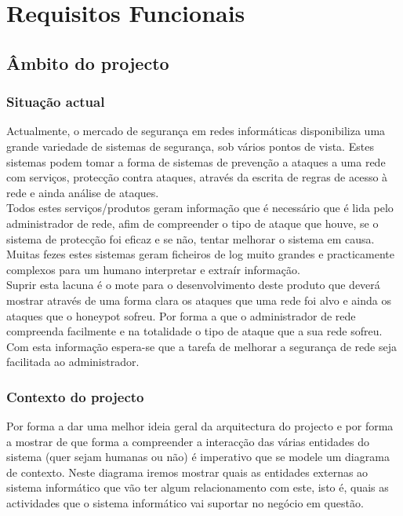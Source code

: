\chapter{Requisitos Funcionais}

\section{Âmbito do projecto}

\subsection{Situação actual}
Actualmente, o mercado de segurança em redes informáticas disponibiliza uma grande variedade de sistemas de segurança, sob vários pontos de vista.
Estes sistemas podem tomar a forma de sistemas de prevenção a ataques a uma rede com serviços, protecção contra ataques, através da
escrita de regras de acesso à rede e ainda análise de ataques.\\
Todos estes serviços/produtos geram informação que é necessário que é lida pelo administrador de rede, afim de compreender o tipo de ataque que houve,
se o sistema de protecção foi eficaz e se não, tentar melhorar o sistema em causa.\\
Muitas fezes estes sistemas geram ficheiros de log muito grandes e practicamente complexos para um humano interpretar e extraír informação.\\
Suprir esta lacuna é o mote para o desenvolvimento deste produto que deverá mostrar através de uma forma clara os ataques que uma rede foi alvo
e ainda os ataques que o honeypot sofreu. Por forma a que o administrador de rede compreenda facilmente e na totalidade o tipo de ataque que a sua rede sofreu.
Com esta informação espera-se que a tarefa de melhorar a segurança de rede seja facilitada ao administrador.

\subsection{Contexto do projecto}
Por forma a dar uma melhor ideia geral da arquitectura do projecto e por forma a mostrar de que forma a compreender
a interacção das várias entidades do sistema (quer sejam humanas ou não) é imperativo que se modele um diagrama de contexto.
Neste diagrama iremos mostrar quais as entidades externas ao sistema informático que vão ter algum relacionamento com este, 
isto é, quais as actividades que o sistema informático vai suportar no negócio em questão. 


